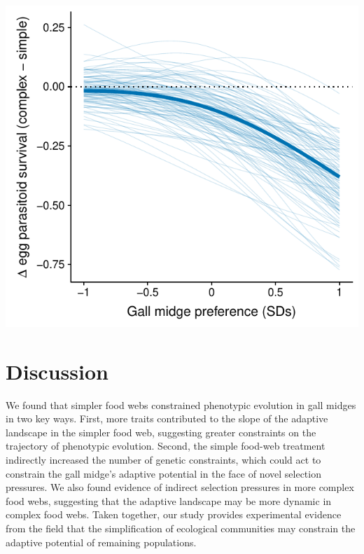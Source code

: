 \documentclass[11pt,]{article}
\let\origfigure\figure
\let\endorigfigure\endfigure
\renewenvironment{figure}[1][2] {
    \expandafter\origfigure\expandafter[H]
} {
    \endorigfigure
}
\begin{document}
\begin{figure}
\centering
\includegraphics{analyses/selection_on_Platygaster.pdf}
\caption{\label{fig:EggPtoid_Selection}Selection imposed by larval
parasitoids on the extended phenotype of egg parasitoids
(\emph{Platygaster} sp.). The bold line represents the average
difference in the probability of observing the egg parasitoid in complex
vs.~simple food webs as a function of gall midge oviposition preference.
Thin lines represent bootstrapped replicates to show the uncertainty in
selection. For clarity, we only display 100 bootstraps even though
inferences are based on 1,000 replicates. The decrease in the
probability of observing egg parasitoids at high gall-midge densities
indicate that larval parasitoids impose nonlinear selection on the
extended phenotype of egg parasitoids.}
\end{figure}

\section{Discussion}\label{discussion}

We found that simpler food webs constrained phenotypic evolution in gall
midges in two key ways. First, more traits contributed to the slope of
the adaptive landscape in the simpler food web, suggesting greater
constraints on the trajectory of phenotypic evolution. Second, the
simple food-web treatment indirectly increased the number of genetic
constraints, which could act to constrain the gall midge's adaptive
potential in the face of novel selection pressures. We also found
evidence of indirect selection pressures in more complex food webs,
suggesting that the adaptive landscape may be more dynamic in complex
food webs. Taken together, our study provides experimental evidence from
the field that the simplification of ecological communities may
constrain the adaptive potential of remaining populations.
\end{document}
